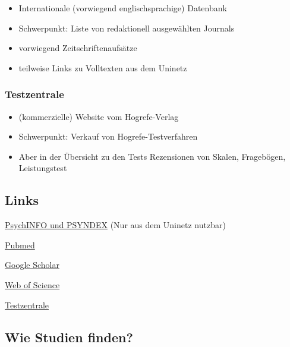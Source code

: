 \documentclass[
]{book}
\providecommand{\tightlist}{%
  \setlength{\itemsep}{0pt}\setlength{\parskip}{0pt}}
\begin{document}
\begin{itemize}
\tightlist
\item
  Internationale (vorwiegend englischsprachige) Datenbank
\item
  Schwerpunkt: Liste von redaktionell ausgewählten Journals
\item
  vorwiegend Zeitschriftenaufsätze
\item
  teilweise Links zu Volltexten aus dem Uninetz
\end{itemize}

\hypertarget{testzentrale}{%
\subsubsection{Testzentrale}\label{testzentrale}}

\begin{itemize}
\tightlist
\item
  (kommerzielle) Website vom Hogrefe-Verlag
\item
  Schwerpunkt: Verkauf von Hogrefe-Testverfahren
\item
  Aber in der Übersicht zu den Tests Rezensionen von Skalen, Fragebögen, Leistungstest
\end{itemize}

\hypertarget{links}{%
\subsection{Links}\label{links}}

\href{http://rzblx10.uni-regensburg.de/dbinfo/dbliste.php?bib_id=ubk\&colors=15\&ocolors=40\&lett=f\&gebiete=22}{PsychINFO und PSYNDEX} (Nur aus dem Uninetz nutzbar)

\href{https://www.ncbi.nlm.nih.gov/pubmed}{Pubmed}

\href{https://scholar.google.de/}{Google Scholar}

\href{https://apps.webofknowledge.com/WOS_GeneralSearch_input.do?product=WOS\&search_mode=GeneralSearch\&SID=C2nuroLClfkbQeKY4ub\&preferencesSaved=}{Web of Science}

\href{https://www.testzentrale.de/}{Testzentrale}

\hypertarget{wie-studien-finden}{%
\subsection{Wie Studien finden?}\label{wie-studien-finden}}
\end{document}
